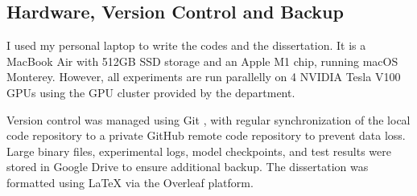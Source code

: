 \vspace{-1.2em}
\subsection{Hardware, Version Control and Backup}
I used my personal laptop to write the codes and the dissertation. It is a MacBook Air with 512GB SSD storage and an Apple M1 chip, running macOS Monterey. However, all experiments are run parallelly on 4 NVIDIA Tesla V100 GPUs using the GPU cluster provided by the department.

Version control was managed using Git \cite{wilson06git}, with regular synchronization of the local code repository to a private GitHub remote code repository to prevent data loss. Large binary files, experimental logs, model checkpoints, and test results were stored in Google Drive to ensure additional backup. The dissertation was formatted using LaTeX via the Overleaf platform.
